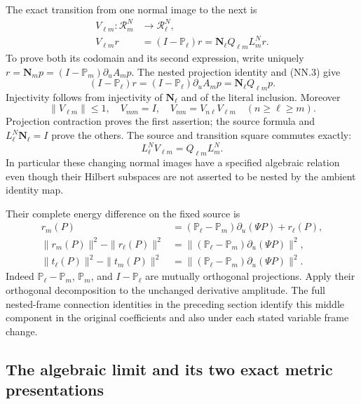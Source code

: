 The exact transition from one normal image to the next is
\[
 \begin{aligned}
 V_{\ell m}:\mathscr R_m^N&\longrightarrow\mathscr R_\ell^N,\\
 V_{\ell m}r&=(I-\mathbb P_\ell)r
       =\boldsymbol N_\ell Q_{\ell m}L_m^N r.
 \end{aligned}
 \tag{NN.6}
\]
To prove both its codomain and its second expression, write uniquely
\(r=\boldsymbol N_m p=(I-\mathbb P_m)\partial_u A_m p\).
The nested projection identity and (NN.3) give
\[
 (I-\mathbb P_\ell)r
   =(I-\mathbb P_\ell)\partial_u A_m p
   =\boldsymbol N_\ell Q_{\ell m}p.
\]
Injectivity follows from injectivity of \(\boldsymbol N_\ell\) and
of the literal inclusion. Moreover
\[
 \|V_{\ell m}\|\le1,\quad V_{mm}=I,\quad
 V_{nm}=V_{n\ell}V_{\ell m}\quad(n\ge\ell\ge m).
 \tag{NN.7}
\]
Projection contraction proves the first assertion; the source formula
and \(L_\ell^N\boldsymbol N_\ell=I\) prove the others.
The source and transition square commutes exactly:
\[
 L_\ell^NV_{\ell m}=Q_{\ell m}L_m^N.
 \tag{NN.8}
\]
In particular these changing normal images have a specified algebraic
relation even though their Hilbert subspaces are not asserted to be
nested by the ambient identity map.

Their complete energy difference on the fixed source is
\[
 \begin{aligned}
 r_m(P)&=(\mathbb P_\ell-\mathbb P_m)\partial_u(\Psi P)+r_\ell(P),\\
 \|r_m(P)\|^2-\|r_\ell(P)\|^2
 &=\|(\mathbb P_\ell-\mathbb P_m)\partial_u(\Psi P)\|^2,\\
 \|t_\ell(P)\|^2-\|t_m(P)\|^2
 &=\|(\mathbb P_\ell-\mathbb P_m)\partial_u(\Psi P)\|^2.
 \end{aligned}
 \tag{NN.9}
\]
Indeed \(\mathbb P_\ell-\mathbb P_m\), \(\mathbb P_m\), and
\(I-\mathbb P_\ell\) are mutually orthogonal projections. Apply
their orthogonal decomposition to the unchanged derivative amplitude.
The full nested-frame connection identities in the preceding section
identify this middle component in the original coefficients and also
under each stated variable frame change.

\subsection{The algebraic limit and its two exact metric presentations}

